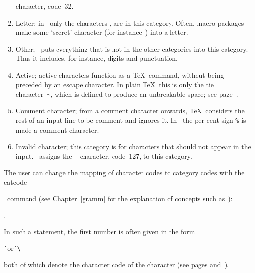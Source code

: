 \documentclass{book}
\begin{document}
\begin{enumerate}
   character, code~32.
\item{}\label{ini:let} Letter; in \IniTeX\ only the
  characters ,  are in this category. Often, macro
  packages make some `secret' character (for instance~\n@) into a
  letter.
\item{}\label{ini:other} Other; \IniTeX\ puts
  everything that is not in the other categories into this
  category. Thus it includes, for instance, digits and punctuation.
\item{} Active; active characters function as a
  \TeX\ command, without being preceded by an escape character.  In
  plain \TeX\ this is only the tie character~\verb-~-, which is
  defined to produce an unbreakable space; see page~\pageref{tie}.
\item{}\label{ini:comm} Comment character; from a
  comment character onwards, \TeX\ considers the rest of an input line
  to be comment and ignores it. In \IniTeX\ the per cent sign \verb-%-
  is made a comment character.
\item{}\label{ini:invalid} Invalid character; this
  category is for characters that should not appear in the
  input. \IniTeX\ assigns the \ascii\  character, code~127,
  to this category.
\end{enumerate}

The user can change the mapping 
of character codes to category codes
with the \csterm catcode\par\ command (see Chapter~\ref{gramm}
for the explanation of concepts such as~):
\begin{disp}.\end{disp}
In such a statement, the first number is often given in the form
\begin{disp}\verb>`>\quad or\quad \verb>`\>\end{disp}
both of which denote the character code of the character
(see pages \pageref{char:code} and~\pageref{int:denotation}).
\end{document}
